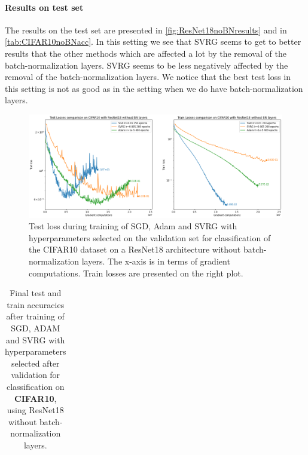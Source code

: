 \documentclass[a4paper,11pt,oneside]{report}
\begin{document}
\paragraph{Results on test set}
The results on the test set are presented in \autoref{fig:ResNet18noBNresults} and in \autoref{tab:CIFAR10noBNacc}.
In this setting we see that SVRG seems to get to better results that the other methods which are affected a lot by the removal of the batch-normalization layers. SVRG seems to be less negatively affected by the removal of the batch-normalization layers. We notice that the best test loss in this setting is not as good as in the setting when we do have batch-normalization layers.

\begin{figure}
    \centering
    \includegraphics[width=\columnwidth]{report/figures/CIFAR10noBN.png}
    \caption{Test loss during training of SGD, Adam and SVRG with hyperparameters selected on the validation set for classification of the CIFAR10 dataset on a ResNet18 architecture without batch-normalization layers. The x-axis is in terms of gradient computations. Train losses are presented on the right plot.}
    \label{fig:ResNet18noBNresults}
\end{figure}

\begin{table}[h]
    \begin{center}
        \begin{tabular}{||c | c | c||}
             \hline
             
        \end{tabular}
    \end{center}
    \caption{Final test and train accuracies after training of SGD, ADAM and SVRG with hyperparameters selected after validation for classification on \textbf{CIFAR10}, using ResNet18 without batch-normalization layers.}
    \label{tab:CIFAR10noBNacc}
\end{table}
\end{document}
